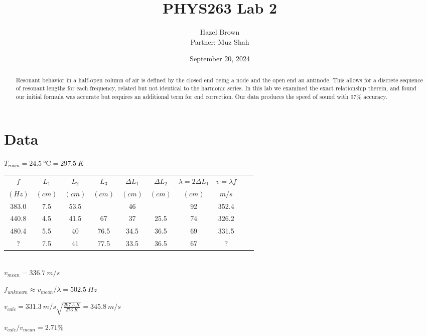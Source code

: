 \documentclass{article}
\title{PHYS263 Lab 2}
\author{Hazel Brown\\[1ex]
\small{Partner: Muz Shah}}
\date{September 20, 2024}
\begin{document}
\maketitle

\setlength\parindent{0pt}

\begin{abstract}
    Resonant behavior in a half-open column of air is defined by the closed end being a node and the open end an antinode. This allows for a discrete sequence of resonant lengths for each frequency, related but not identical to the harmonic series. In this lab we examined the exact relationship therein, and found our initial formula was accurate but requires an additional term for end correction. Our data produces the speed of sound with 97\% accuracy.
\end{abstract}

\section{Data}

$T_{room} = \SI{24.5}{\celsius} = \SI{297.5}{K}$

\vspace{4pt}

\begin{tabular}{|c|c|c|c||c|c|c|c|c|c|}
    \hline
    $f$ & $L_1$ & $L_2$ & $L_3$ & $\Delta L_1$ & $\Delta L_2$ &  $\lambda=2\Delta L_1$ & $v=\lambda f$ \\
    $(\si{Hz})$ & $(\si{cm})$ & $(\si{cm})$ & $(\si{cm})$ &$(\si{cm})$ & $(\si{cm})$ & $(\si{cm})$ & $\si{m/s}$ \\
    \hline
    383.0 & 7.5 & 53.5 &  & 46 &  & 92 & 352.4 \\
    \hline
    440.8 & 4.5 & 41.5 & 67 & 37 & 25.5 & 74 & 326.2 \\
    \hline
    480.4 & 5.5 & 40 & 76.5 & 34.5 & 36.5 & 69 & 331.5 \\
    \hline
     ?     & 7.5 & 41 & 77.5 & 33.5 & 36.5 & 67 & ? \\
    \hline

\end{tabular} \\

$v_{mean} = \SI{336.7}{m/s}$

$f_{unknown} \approx v_{mean} / \lambda = \SI{502.5}{Hz}$

$v_{calc} = \SI{331.3}{m/s} \sqrt{\frac{\SI{297.5}{K}}{\SI{273}{K}}} = \SI{345.8}{m/s}$

$v_{calc} / v_{mean} = 2.71\%$
\end{document}
